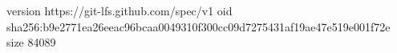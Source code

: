 version https://git-lfs.github.com/spec/v1
oid sha256:b9e2771ea26eeac96bcaa0049310f300cc09d7275431af19ae47e519e001f72e
size 84089
